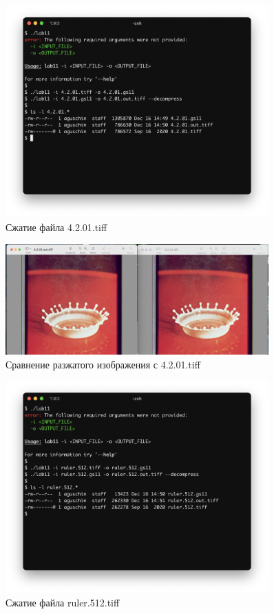 \documentclass[a4paper,oneside]{article}
\theoremstyle{definition}
\begin{document}
\begin{figure}[H]
  \centering
  \includegraphics[width=0.9\textwidth]{test2.jpg}
  \caption{Сжатие файла 4.2.01.tiff}
  \label{fig:test_2}
\end{figure}

\begin{figure}[H]
  \centering
  \includegraphics[width=0.9\textwidth]{test2_img.jpg}
  \caption{Сравнение разжатого изображения с 4.2.01.tiff}
  \label{fig:test_2_img}
\end{figure}


\begin{figure}[H]
  \centering
  \includegraphics[width=0.9\textwidth]{test3.jpg}
  \caption{Сжатие файла ruler.512.tiff}
  \label{fig:test_3}
\end{figure}
\end{document}
